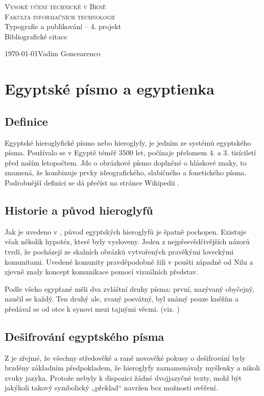 \documentclass[a4paper, 11pt]{article}
\date{}
\begin{document}
\begin{center}
    \Huge
    \textsc{Vysoké učení technické v Brně\\\huge Fakulta informačních technologií}\\
    \LARGE
    Typografie a publikování – 4. projekt\\\Huge 
    Bibliografické citace
\end{center}
{\Large \today \hfill Vadim Goncearenco}
\newpage
{}

\section{Egyptské písmo a egyptienka}
\subsection{Definice}
Egyptské hieroglyfické písmo nebo hieroglyfy, je jedním ze systémů egyptského písma. Používalo se v Egyptě téměř 3500 let, počínaje přelomem 4. a 3. tisíciletí před naším letopočtem. Jde o obrázkové písmo doplněné o hláskové znaky, to znamená, že kombinuje prvky ideografického, slabičného a fonetického písma. Podrobnější definici se dá přečíst na stránce Wikipedii \cite{wiki_en}. 
\subsection{Historie a původ hieroglyfů}
Jak je uvedeno v \cite{worldhistory}, původ egyptských hieroglyfů je špatně pochopen. Existuje však několik hypotéz, které byly vysloveny. Jeden z nejpřesvědčivějších názorů tvrdí, že pocházejí ze skalních obrázků vytvořených pravěkými loveckými komunitami. Uvedené komunity pravděpodobně žili v poušti západně od Nilu a zjevně znaly koncept komunikace pomocí vizuálních představ.

Podle všeho egypťané měli dva zvláštní druhy písma: první, nazývaný obyčejný,
naučil se každý. Ten druhý ale, zvaný posvátný, byl známý pouze kněžím a předával se od otce k synovi mezi tajnými věcmi. (viz. \cite{between_pride_and_prejudice})
\subsection{Dešifrování egyptského písma}
Z \cite{tabula} je zřejmé, že všechny středověké a raně novověké pokusy o dešifrování byly brzděny základním předpokladem, že hieroglyfy zaznamenávaly myšlenky a nikoli zvuky jazyka. Protože nebyly k dispozici žádné dvojjazyčné texty, mohl být jakýkoli takový symbolický „překlad“ navržen bez možnosti ověření.
\end{document}
